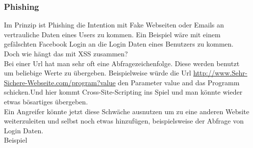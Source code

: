 \subsubsection{Phishing}
Im Prinzip ist Phishing die Intention mit Fake Webseiten oder Emails an vertrauliche Daten eines Users zu kommen. Ein Beispiel wäre mit einem gefälschten Facebook Login an die Login Daten eines Benutzers zu kommen. 
\\Doch wie hängt das mit XSS zusammen?\\Bei einer Url hat man sehr oft eine Abfragezeichenfolge. Diese werden benutzt um beliebige Werte zu übergeben. Beispielweise würde die Url 
\url{ http://www.Sehr-Sichere-Webseite.com/program?value} den Parameter value and das Programm schicken.Und hier kommt Cross-Site-Scripting ins Spiel und man könnte wieder etwas bösartiges übergeben.\\Ein Angreifer könnte jetzt diese Schwäche ausnutzen um zu eine anderen Website weiterzuleiten und selbst noch etwas hinzufügen, beispielsweise der Abfrage von Login Daten. \\Beispiel\\
